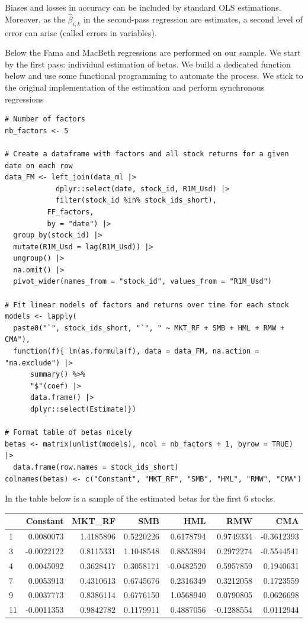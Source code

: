 Biases and losses in accuracy can be included by standard OLS estimations. Moreover, as the $\hat{\beta}_{i,k}$ in the second-pass regression are estimates, a second level of error can arise (called errors in variables). 

Below the Fama and MacBeth regressions are performed on our sample. We start by the first pass: individual estimation of betas. We build a dedicated function below and use some functional programming to automate the process. We stick to the original implementation of the estimation and perform synchronous regressions
\begin{lstlisting}
# Number of factors
nb_factors <- 5

# Create a dataframe with factors and all stock returns for a given date on each row
data_FM <- left_join(data_ml |> 
            dplyr::select(date, stock_id, R1M_Usd) |> 
            filter(stock_id %in% stock_ids_short), 
          FF_factors, 
          by = "date") |> 
  group_by(stock_id) |> 
  mutate(R1M_Usd = lag(R1M_Usd)) |> 
  ungroup() |> 
  na.omit() |> 
  pivot_wider(names_from = "stock_id", values_from = "R1M_Usd")

# Fit linear models of factors and returns over time for each stock 
models <- lapply(
  paste0("`", stock_ids_short, "`", " ~ MKT_RF + SMB + HML + RMW + CMA"), 
  function(f){ lm(as.formula(f), data = data_FM, na.action = "na.exclude") |> 
      summary() %>%
      "$"(coef) |> 
      data.frame() |> 
      dplyr::select(Estimate)}) 

# Format table of betas nicely
betas <- matrix(unlist(models), ncol = nb_factors + 1, byrow = TRUE) |> 
  data.frame(row.names = stock_ids_short)
colnames(betas) <- c("Constant", "MKT_RF", "SMB", "HML", "RMW", "CMA")
\end{lstlisting}

In the table below is a sample of the estimated betas for the first 6 stocks.
\begin{table}[H]
    \centering
    \begin{tabular}[t]{lrrrrrr}
    \toprule
      & Constant & MKT\_RF & SMB & HML & RMW & CMA\\
    \midrule
    1 & 0.0080073 & 1.4185896 & 0.5220226 & 0.6178794 & 0.9749334 & -0.3612393\\
    3 & -0.0022122 & 0.8115331 & 1.1048548 & 0.8853894 & 0.2972274 & -0.5544541\\
    4 & 0.0045092 & 0.3628417 & 0.3058171 & -0.0482520 & 0.5957859 & 0.1940631\\
    7 & 0.0053913 & 0.4310613 & 0.6745676 & 0.2316349 & 0.3212058 & 0.1723559\\
    9 & 0.0037773 & 0.8386114 & 0.6776150 & 1.0568940 & 0.0790805 & 0.0626698\\
    11 & -0.0011353 & 0.9842782 & 0.1179911 & 0.4887056 & -0.1288554 & 0.0112944\\
    \bottomrule
    \end{tabular}
\end{table}

